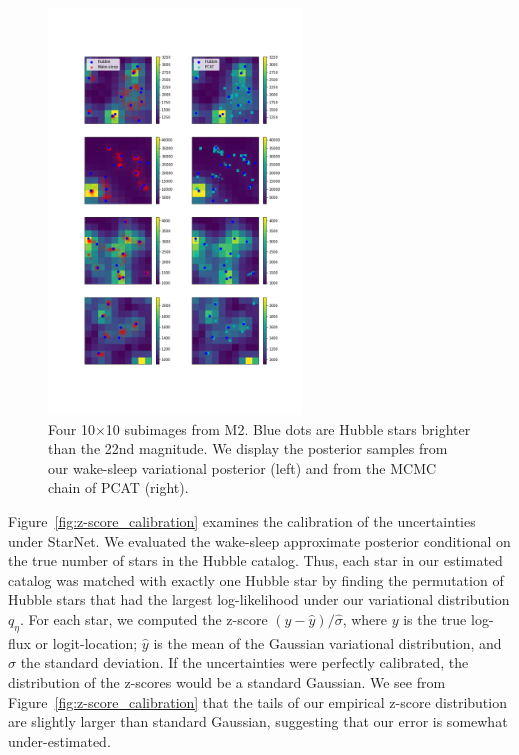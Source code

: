 \begin{figure}[H]
    \centering
    \includegraphics[width=0.6\textwidth]{figures/example_subimages_samples.png}
    \caption{Four 10$\times$10 subimages from
    M2. Blue dots are Hubble stars brighter than the 22nd magnitude.
    We display the posterior samples from our wake-sleep variational
    posterior (left) and from the MCMC chain of PCAT (right). }
    \label{fig:example_subimages_sampled}
\end{figure}
\newpage

Figure~\ref{fig:z-score_calibration} examines the calibration of the uncertainties under StarNet. We evaluated the wake-sleep approximate posterior 
conditional on the true number of stars in the Hubble catalog. 
Thus, each star in our estimated catalog was matched with exactly one Hubble star
by finding the permutation of Hubble stars that had the largest log-likelihood under our variational distribution $q_\eta$. For each star, we computed the z-score $(y - \hat y) / \hat \sigma$, where $y$ is the true log-flux or 
logit-location; $\hat y$ is the mean of the Gaussian variational distribution, and $\hat\sigma$ the standard deviation.
If the uncertainties were perfectly calibrated, the distribution of the z-scores would be a standard Gaussian. 
We see from Figure~\ref{fig:z-score_calibration} that 
the tails of our empirical z-score distribution are slightly larger than standard Gaussian, suggesting that our error is somewhat under-estimated. 

